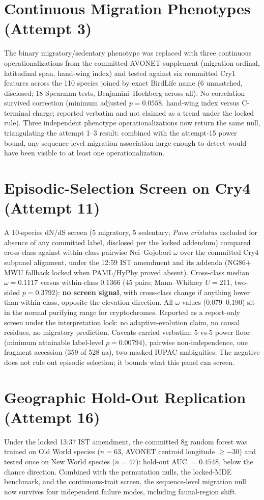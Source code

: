 \documentclass[12pt,a4paper]{article}
\begin{document}
\section{Continuous Migration Phenotypes (Attempt 3)}
The binary migratory/sedentary phenotype was replaced with three continuous operationalizations from the committed AVONET supplement (migration ordinal, latitudinal span, hand-wing index) and tested against six committed Cry1 features across the 110 species joined by exact BirdLife name (6 unmatched, disclosed; 18 Spearman tests, Benjamini--Hochberg across all). No correlation survived correction (minimum adjusted $p = 0.0558$, hand-wing index versus C-terminal charge; reported verbatim and not claimed as a trend under the locked rule). Three independent phenotype operationalizations now return the same null, triangulating the attempt 1--3 result: combined with the attempt-15 power bound, any sequence-level migration association large enough to detect would have been visible to at least one operationalization.

\section{Episodic-Selection Screen on Cry4 (Attempt 11)}
A 10-species dN/dS screen (5 migratory, 5 sedentary; \emph{Pavo cristatus} excluded for absence of any committed label, disclosed per the locked addendum) compared cross-class against within-class pairwise Nei--Gojobori $\omega$ over the committed Cry4 subpanel alignment, under the 12:59 IST amendment and its addenda (NG86$+$MWU fallback locked when PAML/HyPhy proved absent). Cross-class median $\omega = 0.1117$ versus within-class $0.1366$ (45 pairs; Mann--Whitney $U=211$, two-sided $p=0.3792$): \textbf{no screen signal}, with cross-class change if anything lower than within-class, opposite the elevation direction. All $\omega$ values (0.079--0.190) sit in the normal purifying range for cryptochromes. Reported as a report-only screen under the interpretation lock: no adaptive-evolution claim, no causal residues, no migratory prediction. Caveats carried verbatim: 5-vs-5 power floor (minimum attainable label-level $p=0.00794$), pairwise non-independence, one fragment accession (359 of 528 aa), two masked IUPAC ambiguities. The negative does not rule out episodic selection; it bounds what this panel can screen.

\section{Geographic Hold-Out Replication (Attempt 16)}
Under the locked 13:37 IST amendment, the committed 8g random forest was trained on Old World species ($n=63$, AVONET centroid longitude $\geq -30$) and tested once on New World species ($n=47$): hold-out AUC $= 0.4548$, below the chance direction. Combined with the permutation nulls, the locked-MDE benchmark, and the continuous-trait screen, the sequence-level migration null now survives four independent failure modes, including faunal-region shift.
\end{document}
